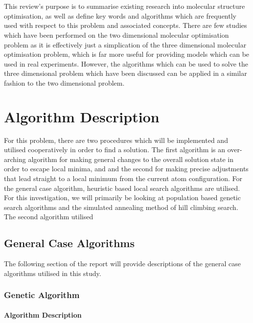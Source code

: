 \documentclass[9pt]{article}
\begin{document}
\\
\\
This review's purpose is to summarise existing research into molecular structure optimisation, as well as define key words and algorithms which are frequently used with respect to this problem and associated concepts. There are few studies which have been performed on the two dimensional molecular optimisation problem as it is effectively just a simplication of the three dimensional molecular optimisation problem, which is far more useful for providing models which can be used in real experiments. However, the algorithms which can be used to solve the three dimensional problem which have been discussed can be applied in a similar fashion to the two dimensional problem.

\section{Algorithm Description}

For this problem, there are two procedures which will be implemented and utilised cooperatively in order to find a solution. The first algorithm is an over-arching algorithm for making general changes to the overall solution state in order to escape local minima, and and the second for making precise adjustments that lead straight to a local minimum  from the current atom configuration. For the general case algorithm, heuristic based local search algorithms are utilised. For this investigation, we will primarily be looking at population based genetic search algorithms and the simulated annealing method of hill climbing search. The second algorithm utilised 

\subsection{General Case Algorithms}

The following section of the report will provide descriptions of the general case algorithms utilised in this study.

\subsubsection{Genetic Algorithm}

\paragraph{Algorithm Description}
\end{document}
